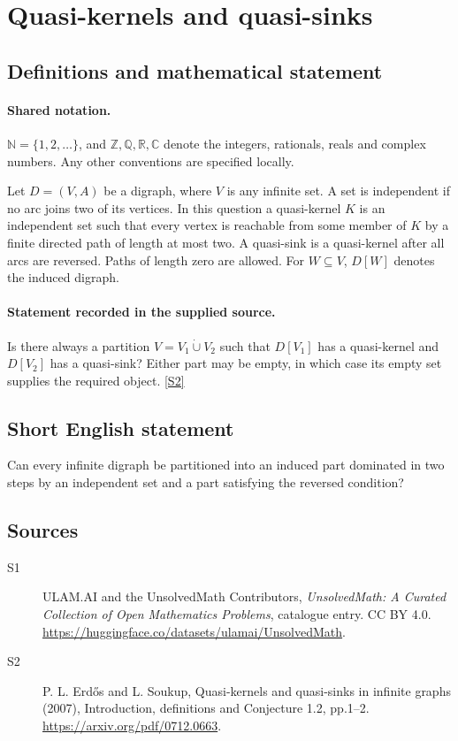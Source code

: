 \documentclass[11pt]{article}
\newcommand{\sref}[2]{\hyperlink{source:#1:#2}{[S#2]}}
\begin{document}
\section{Quasi-kernels and quasi-sinks}\label{statement}

\subsection{Definitions and mathematical statement}

\paragraph{Shared notation.}$\mathbb N=\{1,2,\ldots\}$, and $\mathbb Z,\mathbb Q,\mathbb R,\mathbb C$ denote the integers, rationals, reals and complex numbers. Any other conventions are specified locally.


Let $D=(V,A)$ be a digraph, where $V$ is any infinite set. A set is independent if no arc joins two of its vertices. In this question a quasi-kernel $K$ is an independent set such that every vertex is reachable from some member of $K$ by a finite directed path of length at most two. A quasi-sink is a quasi-kernel after all arcs are reversed. Paths of length zero are allowed. For $W\subseteq V$, $D[W]$ denotes the induced digraph.
\paragraph{Statement recorded in the supplied source.}
Is there always a partition $V=V_1\dot\cup V_2$ such that $D[V_1]$ has a quasi-kernel and $D[V_2]$ has a quasi-sink? Either part may be empty, in which case its empty set supplies the required object. \sref{statement}{2}
\subsection{Short English statement}
Can every infinite digraph be partitioned into an induced part dominated in two steps by an independent set and a part satisfying the reversed condition?
\subsection{Sources}
\begin{description}
\item[\hypertarget{source:statement:1}{S1}] ULAM.AI and the UnsolvedMath Contributors, \emph{UnsolvedMath: A Curated Collection of Open Mathematics Problems}, catalogue entry. CC BY 4.0. \url{https://huggingface.co/datasets/ulamai/UnsolvedMath}.
\item[\hypertarget{source:statement:2}{S2}] P. L. Erdős and L. Soukup, Quasi-kernels and quasi-sinks in infinite graphs (2007), Introduction, definitions and Conjecture 1.2, pp.1--2. \url{https://arxiv.org/pdf/0712.0663}.
\end{description}
\label{end:statement}
\end{document}
